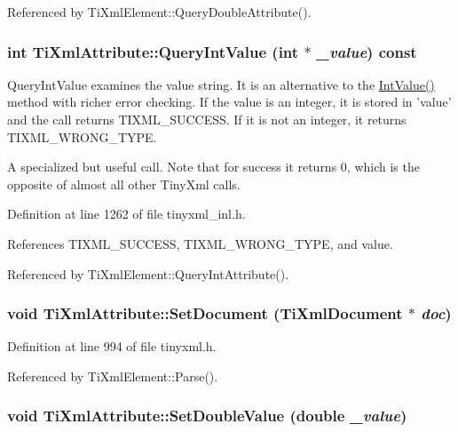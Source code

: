 Referenced by TiXmlElement::QueryDoubleAttribute().\hypertarget{class_ti_xml_attribute_ad6c93088ee21af41a107931223339344}{
\subsubsection[{QueryIntValue}]{\setlength{\rightskip}{0pt plus 5cm}int TiXmlAttribute::QueryIntValue (int $\ast$ {\em \_\-value}) const}}
\label{class_ti_xml_attribute_ad6c93088ee21af41a107931223339344}
QueryIntValue examines the value string. It is an alternative to the \hyperlink{class_ti_xml_attribute_aa1a20ad59dc7e89a0ab265396360d50f}{IntValue()} method with richer error checking. If the value is an integer, it is stored in 'value' and the call returns TIXML\_\-SUCCESS. If it is not an integer, it returns TIXML\_\-WRONG\_\-TYPE.

A specialized but useful call. Note that for success it returns 0, which is the opposite of almost all other TinyXml calls. 

Definition at line 1262 of file tinyxml\_\-inl.h.

References TIXML\_\-SUCCESS, TIXML\_\-WRONG\_\-TYPE, and value.

Referenced by TiXmlElement::QueryIntAttribute().\hypertarget{class_ti_xml_attribute_ac12a94d4548302afb12f488ba101f7d1}{
\subsubsection[{SetDocument}]{\setlength{\rightskip}{0pt plus 5cm}void TiXmlAttribute::SetDocument ({\bf TiXmlDocument} $\ast$ {\em doc})}}
\label{class_ti_xml_attribute_ac12a94d4548302afb12f488ba101f7d1}


Definition at line 994 of file tinyxml.h.

Referenced by TiXmlElement::Parse().\hypertarget{class_ti_xml_attribute_a0316da31373496c4368ad549bf711394}{
\subsubsection[{SetDoubleValue}]{\setlength{\rightskip}{0pt plus 5cm}void TiXmlAttribute::SetDoubleValue (double {\em \_\-value})}}
\label{class_ti_xml_attribute_a0316da31373496c4368ad549bf711394}


